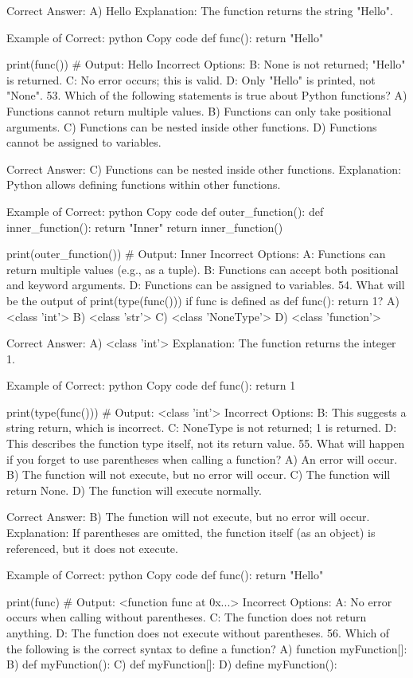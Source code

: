 Correct Answer: A) Hello
Explanation: The function returns the string "Hello".

Example of Correct:
python
Copy code
def func():
    return "Hello"

print(func())  # Output: Hello
Incorrect Options:
B: None is not returned; "Hello" is returned.
C: No error occurs; this is valid.
D: Only "Hello" is printed, not "None".
53. Which of the following statements is true about Python functions?
A) Functions cannot return multiple values.
B) Functions can only take positional arguments.
C) Functions can be nested inside other functions.
D) Functions cannot be assigned to variables.

Correct Answer: C) Functions can be nested inside other functions.
Explanation: Python allows defining functions within other functions.

Example of Correct:
python
Copy code
def outer_function():
    def inner_function():
        return "Inner"
    return inner_function()

print(outer_function())  # Output: Inner
Incorrect Options:
A: Functions can return multiple values (e.g., as a tuple).
B: Functions can accept both positional and keyword arguments.
D: Functions can be assigned to variables.
54. What will be the output of print(type(func())) if func is defined as def func(): return 1?
A) <class 'int'>
B) <class 'str'>
C) <class 'NoneType'>
D) <class 'function'>

Correct Answer: A) <class 'int'>
Explanation: The function returns the integer 1.

Example of Correct:
python
Copy code
def func():
    return 1

print(type(func()))  # Output: <class 'int'>
Incorrect Options:
B: This suggests a string return, which is incorrect.
C: NoneType is not returned; 1 is returned.
D: This describes the function type itself, not its return value.
55. What will happen if you forget to use parentheses when calling a function?
A) An error will occur.
B) The function will not execute, but no error will occur.
C) The function will return None.
D) The function will execute normally.

Correct Answer: B) The function will not execute, but no error will occur.
Explanation: If parentheses are omitted, the function itself (as an object) is referenced, but it does not execute.

Example of Correct:
python
Copy code
def func():
    return "Hello"

print(func)  # Output: <function func at 0x...>
Incorrect Options:
A: No error occurs when calling without parentheses.
C: The function does not return anything.
D: The function does not execute without parentheses.
56. Which of the following is the correct syntax to define a function?
A) function myFunction[]:
B) def myFunction():
C) def myFunction[]:
D) define myFunction():

